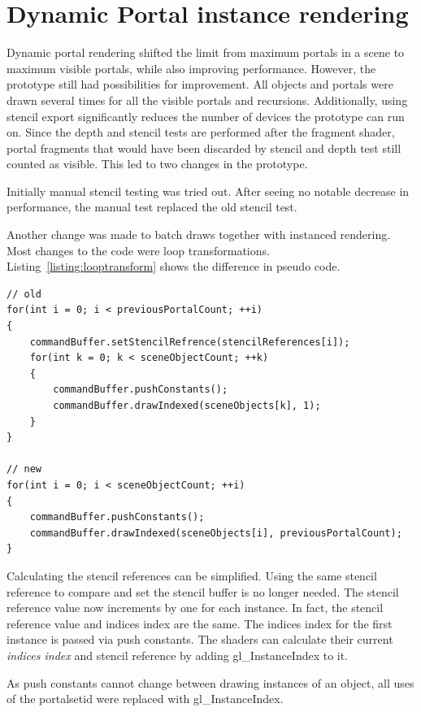 \section{Dynamic Portal instance rendering}
\label{section:dynamicportalinstancerendering}
Dynamic portal rendering shifted the limit from maximum portals in a scene to maximum visible portals, while also improving performance. However, the prototype still had possibilities for improvement. All objects and portals were drawn several times for all the visible portals and recursions. Additionally, using stencil export significantly reduces the number of devices the prototype can run on. Since the depth and stencil tests are performed after the fragment shader, portal fragments that would have been discarded by stencil and depth test still counted as visible. This led to two changes in the prototype.

Initially manual stencil testing was tried out. After seeing no notable decrease in performance, the manual test replaced the old stencil test.

Another change was made to batch draws together with instanced rendering. Most changes to the code were loop transformations. Listing~\ref{listing:looptransform} shows the difference in pseudo code.

\begin{lstlisting}[caption={Pseudocode Loop Transformation}, label=listing:looptransform]
// old 
for(int i = 0; i < previousPortalCount; ++i)
{
	commandBuffer.setStencilRefrence(stencilReferences[i]);
	for(int k = 0; k < sceneObjectCount; ++k)
	{
		commandBuffer.pushConstants();
		commandBuffer.drawIndexed(sceneObjects[k], 1);
	}
}

// new
for(int i = 0; i < sceneObjectCount; ++i)
{
	commandBuffer.pushConstants();
	commandBuffer.drawIndexed(sceneObjects[i], previousPortalCount);
}
\end{lstlisting}


Calculating the stencil references can be simplified. Using the same stencil reference to compare and set the stencil buffer is no longer needed. The stencil reference value now increments by one for each instance. In fact, the stencil reference value and indices index are the same. The indices index for the first instance is passed via push constants. The shaders can calculate their current \textit{indices index} and stencil reference by adding gl\_InstanceIndex to it.

As push constants cannot change between drawing  instances of an object, all uses of the \gls{portalsetid} were replaced with gl\_InstanceIndex.


